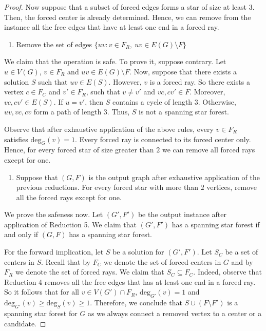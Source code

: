 \documentclass[en]{pracamgr}
\theoremstyle{definition}
\newcommand{\ssf}{spanning star forest}
\newcommand{\degree}[2]{\textrm{deg}_{#1}(#2)}
\begin{document}
\begin{proof}
	Now suppose that a subset of forced edges forms a star of size at least $3$. Then, the forced center is already determined. Hence, we can remove from the instance all the free edges that have at least one end in a forced ray. 
	
	\begin{enumerate}[leftmargin=*,label=\textbf{Reduction \arabic{enumi}},resume,wide, labelwidth=!, labelindent=0pt]
		\item Remove the set of edges $\{uv: v \in F_R,\ uv \in E(G) \setminus F\}$
	\end{enumerate}
	We claim that the operation is safe. To prove it, suppose contrary. Let $u \in V(G)$, $v \in F_R$ and $uv \in E(G) \setminus F$. Now, suppose that there exists a solution $S$ such that $uv \in E(S)$. However, $v$ is a forced ray. So there exists a vertex $c \in F_C$ and $v' \in F_R$, such that $v \neq v'$ and $vc,cv' \in F$. Moreover, $vc,cv' \in E(S)$. If $u=v'$, then $S$ contains a cycle of length $3$. Otherwise, $uv,vc,cv$ form a path of length $3$. Thus, $S$ is not a spanning star forest.

	Observe that after exhaustive application of the above rules, every $v \in F_R$ satisfies $\degree{G}{v}=1$. Every forced ray is connected to its forced center only. Hence, for every forced star of size greater than $2$ we can remove all forced rays except for one.


	\begin{enumerate}[leftmargin=*,label=\textbf{Reduction \arabic{enumi}},resume,wide, labelwidth=!, labelindent=0pt]
		\item Suppose that $(G,F)$ is the output graph after exhaustive application of the previous reductions. For every forced star with more than $2$ vertices, remove all the forced rays except for one.
	\end{enumerate}

	We prove the safeness now. Let $(G',F')$ be the output instance after application of Reduction 5. We claim that $(G',F')$ has a \ssf{} if and only if $(G,F)$ has a \ssf{}. 
	
	For the forward implication, let $S$ be a solution for $(G',F')$. Let $S_C$ be a set of centers in $S$. Recall that by $F_C$ we denote the set of forced centers in $G$ and by $F_R$ we denote the set of forced rays. We claim that $S_C \subseteq F_C$. Indeed, observe that Reduction 4 removes all the free edges that has at least one end in a forced ray. So it follows that for all $v \in V(G') \cap F_R$, $\degree{G'}{v}=1$ and $\degree{G'}{v} \geq \degree{S}{v} \geq 1$. Therefore, we conclude that $S \cup (F \setminus F')$ is a spanning star forest for $G$ as we always connect a removed vertex to a center or a candidate.
	

\end{proof}
\end{document}
